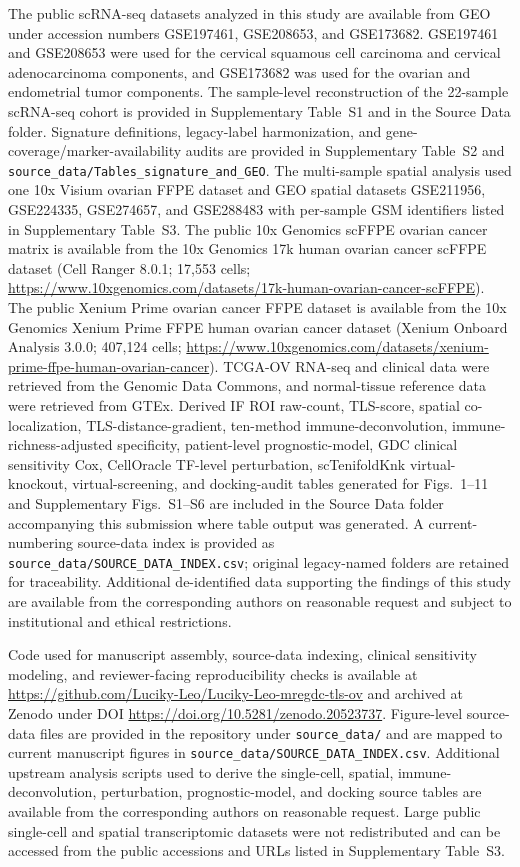 \documentclass[pdflatex,sn-vancouver-num]{sn-jnl}
\begin{document}
The public scRNA-seq datasets analyzed in this study are available from GEO under accession numbers GSE197461, GSE208653, and GSE173682. GSE197461 and GSE208653 were used for the cervical squamous cell carcinoma and cervical adenocarcinoma components, and GSE173682 was used for the ovarian and endometrial tumor components. The sample-level reconstruction of the 22-sample scRNA-seq cohort is provided in Supplementary Table~S1 and in the Source Data folder. Signature definitions, legacy-label harmonization, and gene-coverage/marker-availability audits are provided in Supplementary Table~S2 and \texttt{source\_data/Tables\_signature\_and\_GEO}. The multi-sample spatial analysis used one 10x Visium ovarian FFPE dataset and GEO spatial datasets GSE211956, GSE224335, GSE274657, and GSE288483 with per-sample GSM identifiers listed in Supplementary Table~S3. The public 10x Genomics scFFPE ovarian cancer matrix is available from the 10x Genomics 17k human ovarian cancer scFFPE dataset (Cell Ranger 8.0.1; 17,553 cells; \url{https://www.10xgenomics.com/datasets/17k-human-ovarian-cancer-scFFPE}). The public Xenium Prime ovarian cancer FFPE dataset is available from the 10x Genomics Xenium Prime FFPE human ovarian cancer dataset (Xenium Onboard Analysis 3.0.0; 407,124 cells; \url{https://www.10xgenomics.com/datasets/xenium-prime-ffpe-human-ovarian-cancer}). TCGA-OV RNA-seq and clinical data were retrieved from the Genomic Data Commons, and normal-tissue reference data were retrieved from GTEx. Derived IF ROI raw-count, TLS-score, spatial co-localization, TLS-distance-gradient, ten-method immune-deconvolution, immune-richness-adjusted specificity, patient-level prognostic-model, GDC clinical sensitivity Cox, CellOracle TF-level perturbation, scTenifoldKnk virtual-knockout, virtual-screening, and docking-audit tables generated for Figs.~1--11 and Supplementary Figs.~S1--S6 are included in the Source Data folder accompanying this submission where table output was generated. A current-numbering source-data index is provided as \texttt{source\_data/SOURCE\_DATA\_INDEX.csv}; original legacy-named folders are retained for traceability. Additional de-identified data supporting the findings of this study are available from the corresponding authors on reasonable request and subject to institutional and ethical restrictions.

Code used for manuscript assembly, source-data indexing, clinical sensitivity modeling, and reviewer-facing reproducibility checks is available at \url{https://github.com/Luciky-Leo/Luciky-Leo-mregdc-tls-ov} and archived at Zenodo under DOI \url{https://doi.org/10.5281/zenodo.20523737}. Figure-level source-data files are provided in the repository under \texttt{source\_data/} and are mapped to current manuscript figures in \texttt{source\_data/SOURCE\_DATA\_INDEX.csv}. Additional upstream analysis scripts used to derive the single-cell, spatial, immune-deconvolution, perturbation, prognostic-model, and docking source tables are available from the corresponding authors on reasonable request. Large public single-cell and spatial transcriptomic datasets were not redistributed and can be accessed from the public accessions and URLs listed in Supplementary Table~S3.
\end{document}
